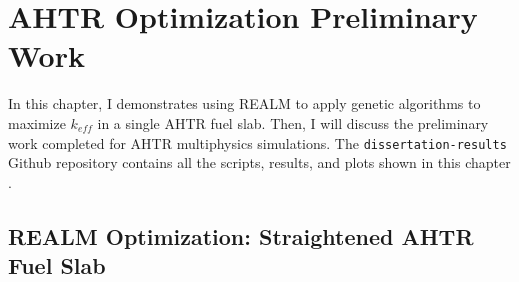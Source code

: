 \chapter{AHTR Optimization Preliminary Work}
\label{chap:realm-demo}
In this chapter, I demonstrates using \gls{REALM} to apply genetic algorithms 
to maximize $k_{eff}$ in a single \gls{AHTR} fuel slab. 
Then, I will discuss the preliminary work completed for \gls{AHTR} multiphysics 
simulations.
The \texttt{dissertation-results} Github repository contains all the scripts, 
results, and plots shown in this chapter \cite{chee_dissertation-results_2021}.

\section{REALM Optimization: Straightened AHTR Fuel Slab}
